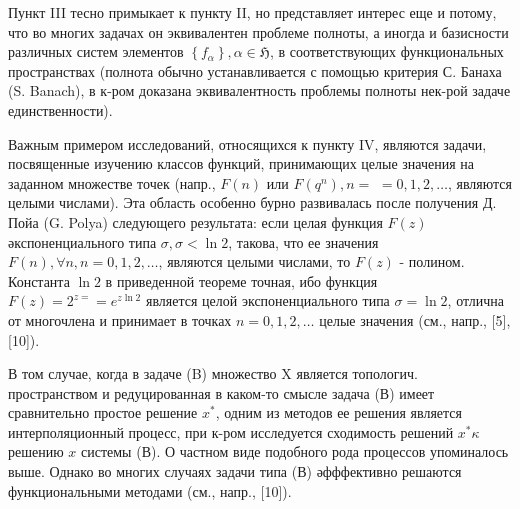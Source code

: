 \documentclass[10pt]{article}
\begin{document}
Пункт III тесно примыкает к пункту II, но представляет интерес еще и потому, что во многих задачах он эквивалентен проблеме полноты, а иногда и базисности различных систем элементов $\left\{f_{\alpha}\right\}, \alpha \in \mathfrak{H}$, в соответствующих функциональных пространствах (полнота обычно устанавливается с помощью критерия С. Банаха (S. Banach), в к-ром доказана эквивалентность проблемы полноты нек-рой задаче единственности).



Важным примером исследований, относящихся к пункту IV, являются задачи, посвященные изучению классов функций, принимающих целые значения на заданном множестве точек (напр., $F(n)$ или $F\left(q^{n}\right), n=$ $=0,1,2, \ldots$, являются целыми числами). Эта область особенно бурно развивалась после получения Д. Пойа (G. Polya) следующего результата: если целая функция $F(z)$ әкспоненциального типа $\sigma, \sigma<\ln 2$, такова, что ее значения $F(n), \forall n, n=0,1,2, \ldots$, являются целыми числами, то $F(z)$ - полином. Константа $\ln 2$ в приведенной теореме точная, ибо функция $F(z)=2^{z=}=e^{z \ln 2}$ является целой экспоненциального типа $\sigma=\ln 2$, отлична от многочлена и принимает в точках $n=0,1,2, \ldots$ целые значения (см., напр., [5], [10]).



В том случае, когда в задаче (B) множество X является топологич. пространством и редуцированная в каком-то смысле задача (В) имеет сравнительно простое решение $x^{*}$, одним из методов ее решения является интерполяционный процесс, при к-ром исследуется сходимость решений $x^{*} \kappa$ решению $x$ системы (В). О частном виде подобного рода процессов упоминалось выше. Однако во многих случаях задачи типа (В) әфффективно решаются функциональными методами (см., напр., [10]).
\end{document}
